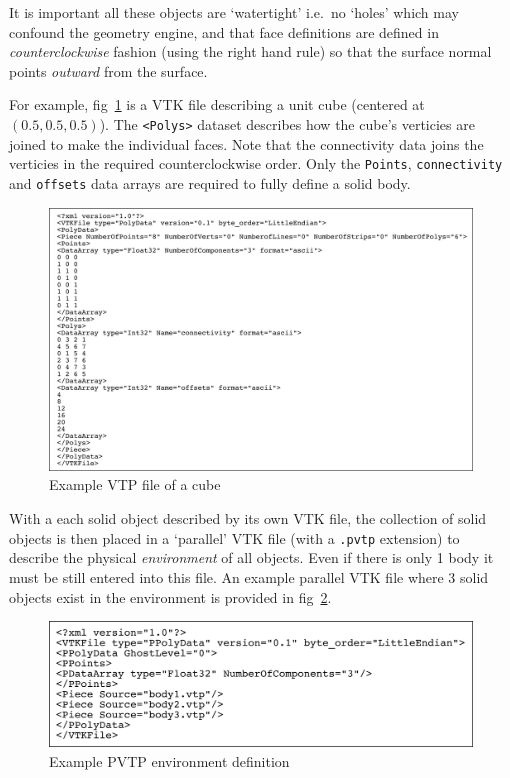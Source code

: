 \documentclass[pdftex, 12pt, a4paper]{report}
\begin{document}
It is important all these objects are `watertight' i.e.\ no `holes' which may confound
the geometry engine, and that face definitions are defined in \emph{counterclockwise} fashion (using the right hand rule) so that
the surface normal points \emph{outward} from the surface.  

For example, fig~\ref{fig:vtp_cube} is a VTK file describing a unit cube (centered at $\left(0.5, 0.5, 0.5\right)$).  The     
\verb'<Polys>' dataset describes how the cube's verticies are joined to make the individual faces.  Note that the connectivity
data joins the verticies in the required counterclockwise order.  Only the \verb'Points', \verb'connectivity' and \verb'offsets'
data arrays are required to fully define a solid body.

\begin{figure}[htp]
\centering
\includegraphics[width=17cm]{pics/VTP_cube_file.jpg}
\caption{Example VTP file of a cube}
\label{fig:vtp_cube}
\end{figure}

With a each solid object described by its own VTK file, the collection of solid objects is then placed in a 
`parallel' VTK file (with a \verb'.pvtp' extension) to describe the physical \emph{environment} of all objects.
Even if there is only 1 body it must be still entered into this file.  
An example parallel VTK file where 3 solid objects exist in the environment is provided in fig~\ref{fig:XML_eg}.

\begin{figure}[htp]
\centering
\includegraphics[width=14cm]{pics/PVTP_file.jpg}
\caption{Example PVTP environment definition}
\label{fig:XML_eg}
\end{figure}
\newpage
\end{document}
